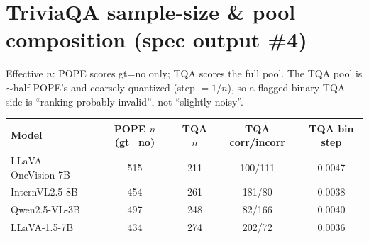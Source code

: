 \documentclass[11pt,a4paper]{article}
\begin{document}
\section*{TriviaQA sample-size \& pool composition (spec output \#4)}
Effective $n$: POPE scores gt=no only; TQA scores the full pool. The TQA pool is
$\sim$half POPE's and coarsely quantized (step $=1/n$), so a flagged binary TQA
side is ``ranking probably invalid'', not ``slightly noisy''.
\begin{center}\small\begin{tabular}{l c c c c}
\toprule Model & POPE $n$ (gt=no) & TQA $n$ & TQA corr/incorr & TQA bin step \\ \midrule
LLaVA-OneVision-7B & 515 & 211 & 100/111 & 0.0047 \\
InternVL2.5-8B & 454 & 261 & 181/80 & 0.0038 \\
Qwen2.5-VL-3B & 497 & 248 & 82/166 & 0.0040 \\
LLaVA-1.5-7B & 434 & 274 & 202/72 & 0.0036 \\
\bottomrule\end{tabular}\end{center}
\end{document}
